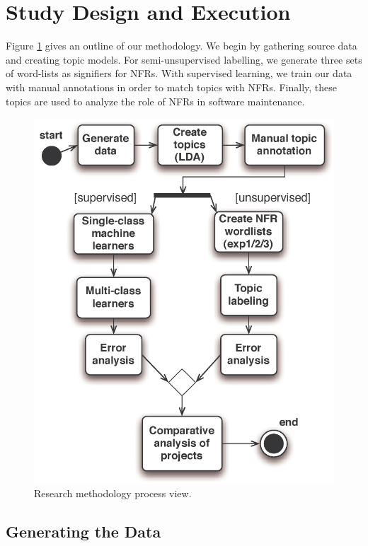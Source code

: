 \documentclass[smallextended]{svjour3}       %
\begin{document}
\section{Study Design and Execution}
Figure \ref{fig:process} gives an outline of our methodology.
We begin by gathering source data and creating topic models. For semi-unsupervised labelling, we generate three sets of word-lists as signifiers for NFRs.
With supervised learning, we train our data with manual annotations in order to match topics with NFRs. Finally, these topics are used to analyze the
role of NFRs in software maintenance.

\begin{figure}
  \centering
 \includegraphics[width=.45\textwidth]{figures/process-model}
 \caption{Research methodology process view.}
  \label{fig:process}
\end{figure}

\subsection{Generating the Data}
\label{sec:wordlist}
\end{document}

